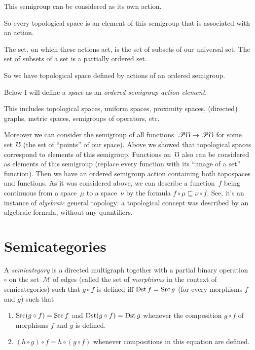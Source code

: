 This semigroup can be considered as its own action.

So every topological space is an element of this semigroup that is associated with an action.

The set, on which these actions act, is the set of subsets of our universal set. The set of subsets of a set is a partially ordered set.

So we have topological space defined by actions of an ordered semigroup.

Below I will define a \emph{space} as an \emph{ordered semigroup action element}.

This includes topological spaces, uniform spaces, proximity spaces, (directed) graphs, metric spaces, semigroups of operators, etc.

Moreover we can consider the semigroup of all functions~$\mathscr{P}\mho\to\mathscr{P}\mho$ for some set~$\mho$ (the set of ``points'' of our space). Above we showed that topological spaces correspond to elements of this semigroup. Functions on~$\mho$ also can be considered as elements of this semigroup (replace every function with its ``image of a set'' function). Then we have an ordered semigroup action containing both topospaces and functions. As it was considered above, we can describe a function~$f$ being continuous from a space~$\mu$ to a space~$\nu$ by the formula $f\circ\mu\sqsubseteq\nu\circ f$. See, it's an instance of \emph{algebraic} general topology: a topological concept was described by an algebraic formula, without any quantifiers.

\chapter{Semicategories}

\begin{defn}
A \emph{semicategory} is a directed multigraph
together with a partial binary operation $\circ$ on the set~$\mathcal{M}$ of edges (called the set of \emph{morphisms} in the context of semicategories)
such that $g\circ f$ is defined iff $\operatorname{Dst} f=\operatorname{Src} g$ (for every morphisms
$f$ and $g$) such that
\begin{enumerate}
\item $\operatorname{Src}(g\circ f)=\operatorname{Src} f$ and $\operatorname{Dst}(g\circ f)=\operatorname{Dst} g$ whenever the
composition $g\circ f$ of morphisms $f$ and $g$ is defined.
\item $(h\circ g)\circ f=h\circ(g\circ f)$ whenever compositions in this
equation are defined.
\end{enumerate}
\end{defn}

